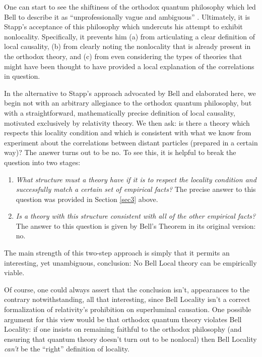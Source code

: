 \documentclass[aps,prc,onecolumn,12pt,nofootinbib]{revtex4-2}
\begin{document}
One can start to see the shiftiness of the orthodox quantum
philosophy which led Bell to describe it as ``unprofessionally vague
and ambiguous'' \cite[pg 173]{bell}.  Ultimately, it is Stapp's
acceptance of this philosophy which undercuts his attempt to
exhibit nonlocality.  Specifically, it prevents him (a) from
articulating a clear definition of local causality, (b) from clearly
noting the nonlocality that is already present in the orthodox
theory, and (c) from even considering the types of theories that
might have been thought to have provided a local explanation of
the correlations in question.

In the alternative to Stapp's approach advocated by Bell and
elaborated here, we begin not with an
arbitrary allegiance to the orthodox quantum philosophy,
but with a straightforward, mathematically precise definition of
local causality, motivated exclusively by relativity theory.
We then ask:  is there a theory which respects this
locality condition and which is consistent with what we know from
experiment about the correlations between distant particles (prepared
in a certain way)?  The answer turns out to be no.  To see this, it
is helpful to break the question into two stages:
\begin{enumerate}

\item  \emph{What structure must a theory have if it is to respect the
locality condition and successfully match a certain set of
empirical facts?}  The precise answer to this question was provided
in Section \ref{sec3} above.

\item  \emph{Is a theory with this structure consistent with all of
    the other empirical facts?}  The answer to this question is given
    by Bell's Theorem in its original version:  no.

\end{enumerate}
The main strength of this two-step approach is simply that it permits an
interesting, yet unambiguous, conclusion:  No Bell Local theory can be
empirically viable.

Of course, one could always
assert that the conclusion isn't, appearances to the contrary
notwithstanding, all that interesting, since Bell Locality isn't
a correct formalization of relativity's
prohibition on superluminal causation.  One possible
argument for this view would be that orthodox quantum theory
violates Bell
Locality:  if one insists on remaining faithful to the orthodox
philosophy (and ensuring that quantum theory
doesn't turn out to be nonlocal)
then Bell Locality \emph{can't} be the ``right'' definition of
locality.
\end{document}
